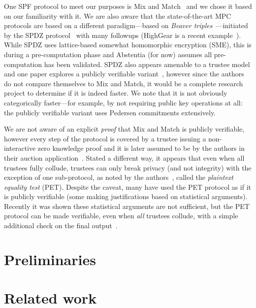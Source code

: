 One SPF protocol to meet our purposes is Mix and Match~\cite{JJ00} and we chose it based on our familiarity with it. We are also aware that the state-of-the-art MPC protocols are based on a different paradigm---based on \emph{Beaver triples}~\cite{beaver1997commodity}---initiated by the SPDZ protocol~\cite{damgaard2012multiparty,damgaard2013practical} with many followups (HighGear is a recent example~\cite{keller2018overdrive}). While SPDZ uses lattice-based somewhat homomorphic encryption (SME), this is during a pre-computation phase and Abstentia (for now) assumes all pre-computation has been validated. SPDZ also appears amenable to a trustee model and one paper explores a publicly verifiable variant~\cite{baum2014publicly}, however since the authors do not compare themselves to Mix and Match, it would be a complete research project to determine if it is indeed faster. We note that it is not obviously categorically faster---for example, by not requiring public key operations at all: the publicly verifiable variant uses Pedersen commitments extensively.  

We are not aware of an explicit \emph{proof} that Mix and Match is publicly verifiable, however every step of the protocol is covered by a trustee issuing a non-interactive zero knowledge proof and it is later assumed to be by the authors in their auction application~\cite{JJ00}. Stated a different way, it appears that even when all trustees fully collude, trustees can only break privacy (and not integrity) with the exception of one sub-protocol, as noted by the authors~\cite{JJ00}, called the \emph{plaintext equality test} (PET). Despite the caveat, many have used the PET protocol as if it is publicly verifiable (some making justifications based on statistical arguments). Recently it was shown these statistical arguments are not sufficient, but the PET protocol can be made verifiable, even when \emph{all} trustees collude, with a simple additional check on the final output~\cite{mcmurtry2020test}.


\section{Preliminaries}

\section{Related work}
\label{sec:lit}

